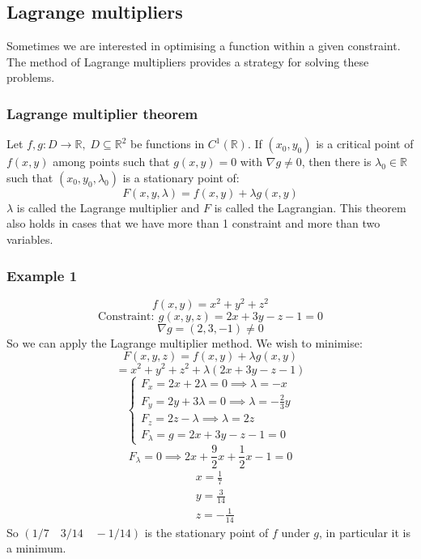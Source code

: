 \documentclass[12pt]{article}
\begin{document}
\subsection*{Lagrange multipliers}
Sometimes we are interested in optimising a function within a given constraint. The method of Lagrange multipliers provides a strategy for solving these problems.
\subsubsection*{Lagrange multiplier theorem}
Let \(f,g:D\to\mathbb{R},\;D\subseteq \mathbb{R}^2\) be functions in \(C^{1}(\mathbb{R})\). If \((x_0,y_0)\) is a critical point of \(f(x,y)\) among points such that \(g(x,y)=0\) with \(\nabla g\ne 0\), then there is \(\lambda_0\in\mathbb{R}\) such that \((x_0,y_0,\lambda_0)\) is a stationary point of:
\[F(x,y,\lambda)=f(x,y)+\lambda g(x,y)\]
\(\lambda\) is called the Lagrange multiplier and \(F\) is called the Lagrangian. This theorem also holds in cases that we have more than 1 constraint and more than two variables.
\subsubsection*{Example 1}
\[f(x,y)=x^2+y^2+z^2\]
\[\text{Constraint}:\ g(x,y,z)=2x+3y-z-1=0\]
\[\nabla g=(2,3,-1)\ne 0\]
So we can apply the Lagrange multiplier method. We wish to minimise:
\[F(x,y,z)=f(x,y)+\lambda g(x,y)\]
\[=x^2+y^2+z^2+\lambda(2x+3y-z-1)\]
\[\begin{cases}
    F_x = 2x+2\lambda=0\implies \lambda =-x \\
    F_y= 2y+3\lambda=0\implies \lambda=-\frac{2}{3}y \\
    F_z=2z-\lambda\implies\lambda=2z \\
    F_\lambda =g=2x+3y-z-1=0
\end{cases}\]
\[F_\lambda=0\implies 2x+\frac{9}{2}x+\frac{1}{2}x-1=0\]
\begin{align*}
    &x=\frac{1}{7} \\
    &y=\frac{3}{14} \\
    &z=-\frac{1}{14}
\end{align*}
So \((1/7\quad 3/14\quad -1/14)\) is the stationary point of \(f\) under \(g\), in particular it is a minimum.
\end{document}

